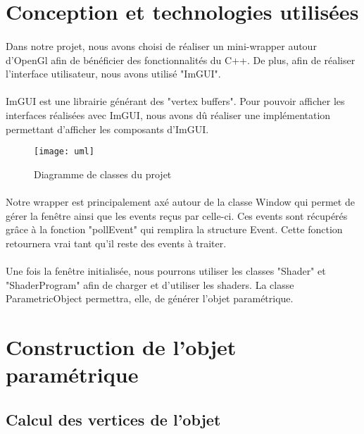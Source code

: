 \documentclass[article, backcover, french, nodocumentinfo]{upmethodology-document}
\begin{document}
	\section{Conception et technologies utilisées}
		\paragraph*{}
			Dans notre projet, nous avons choisi de réaliser un mini-wrapper autour d'OpenGl afin de bénéficier des fonctionnalités du C++.
			De plus, afin de réaliser l'interface utilisateur, nous avons utilisé "ImGUI".
		\paragraph*{}
			ImGUI est une librairie générant des "vertex buffers".
			Pour pouvoir afficher les interfaces réalisées avec ImGUI, nous avons dû réaliser une implémentation permettant d'afficher les composants d'ImGUI.

			\begin{figure}[H]
				\centering%
				\texttt{[image: uml]}
				\caption{Diagramme de classes du projet}
				\label{fig:uml}
			\end{figure}

		\paragraph*{}
			Notre wrapper est principalement axé autour de la classe Window qui permet de gérer la fenêtre ainsi que les events reçus par celle-ci.
			Ces events sont récupérés grâce à la fonction "pollEvent" qui remplira la structure Event. Cette fonction retournera vrai tant qu'il reste des events à traiter.
		\paragraph*{}
			Une fois la fenêtre initialisée, nous pourrons utiliser les classes "Shader" et "ShaderProgram" afin de charger et d'utiliser les shaders.
			La classe ParametricObject permettra, elle, de générer l'objet paramétrique.

	\section{Construction de l'objet paramétrique}
	\subsection{Calcul des vertices de l'objet}
\end{document}
